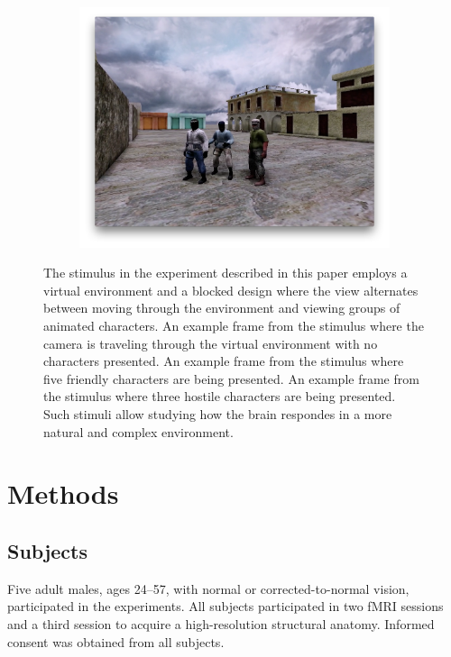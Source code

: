 \documentclass[5p,authoryear]{elsarticle}
\begin{document}
\begin{figure}
\begin{subfigure}{0.3\textwidth}
\includegraphics[width=\textwidth]{figures/stimulus-three-insurgents}
\caption{}
\label{fig:stimulus-three-insurgents}
\end{subfigure}
\caption{
The stimulus in the experiment described in this paper employs a virtual environment and a blocked design where the view alternates between moving through the environment and viewing groups of animated characters.
 An example frame from the stimulus where the camera is traveling through the virtual environment with no characters presented.
 An example frame from the stimulus where five friendly characters are being presented.
 An example frame from the stimulus where three hostile characters are being presented.
Such stimuli allow studying how the brain respondes in a more natural and complex environment.
}
\label{fig:stimulus}
\end{figure}

\section{Methods}

\subsection{Subjects}
Five adult males, ages 24--57, with normal or corrected-to-normal vision, participated in the experiments. 
All subjects participated in two fMRI sessions and a third session to acquire a high-resolution structural anatomy. 
Informed consent was obtained from all subjects.
\end{document}
